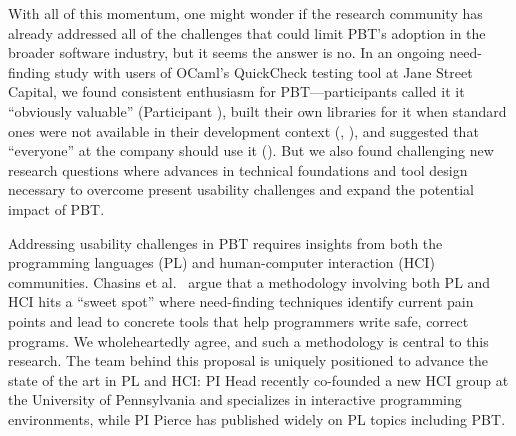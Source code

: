 With all of this momentum, one might wonder if the research community has
already
addressed all of the challenges that could limit PBT's adoption
in the broader software industry, but it
seems the answer is no.
In an ongoing need-finding study with users of OCaml's QuickCheck testing tool
at Jane Street Capital, we found
consistent enthusiasm for PBT---participants called it it
``obviously valuable'' (Participant ),
built their own libraries for it when standard ones were not available in their
development context (,
), and suggested that ``everyone'' at the company should use it
(). But we also found
challenging new research questions where advances in technical foundations and
tool design necessary to overcome present usability challenges and expand the
potential impact of PBT.

Addressing usability challenges in PBT requires insights from both the
programming languages (PL) and
human-computer interaction (HCI) communities.  Chasins et
al.~\cite{chasins_pl_2021} argue that a methodology
involving
both PL and HCI hits a ``sweet spot'' where need-finding techniques identify
current pain points and lead to concrete tools that help programmers write
safe, correct programs. We wholeheartedly agree, and such a methodology is
central to this research.
The team behind this proposal is uniquely positioned to advance the
state of the art in PL and HCI: PI Head recently co-founded
a new HCI group at the University of Pennsylvania and specializes in interactive
programming environments, while PI Pierce has
published widely on PL topics including PBT.

